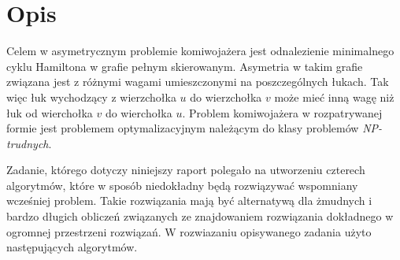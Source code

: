 \section{Opis}

Celem w asymetrycznym problemie komiwojażera jest odnalezienie
minimalnego cyklu Hamiltona w grafie pełnym skierowanym.
Asymetria w takim grafie związana jest z różnymi wagami
umieszczonymi na poszczególnych łukach. Tak więc łuk wychodzący z wierzchołka
$u$ do wierzchołka $v$ może mieć inną wagę niż łuk
od wierchołka $v$ do wierchołka $u$. Problem komiwojażera w rozpatrywanej
formie jest problemem optymalizacyjnym należącym do klasy problemów
\emph{NP-trudnych}.

Zadanie, którego dotyczy niniejszy raport polegało na utworzeniu czterech
algorytmów, które w sposób niedokładny będą rozwiązywać wspomniany
wcześniej problem. Takie rozwiązania mają być alternatywą dla żmudnych
i bardzo długich obliczeń związanych ze znajdowaniem rozwiązania
dokładnego w ogromnej przestrzeni rozwiązań.
W rozwiazaniu opisywanego zadania użyto następujących algorytmów.

